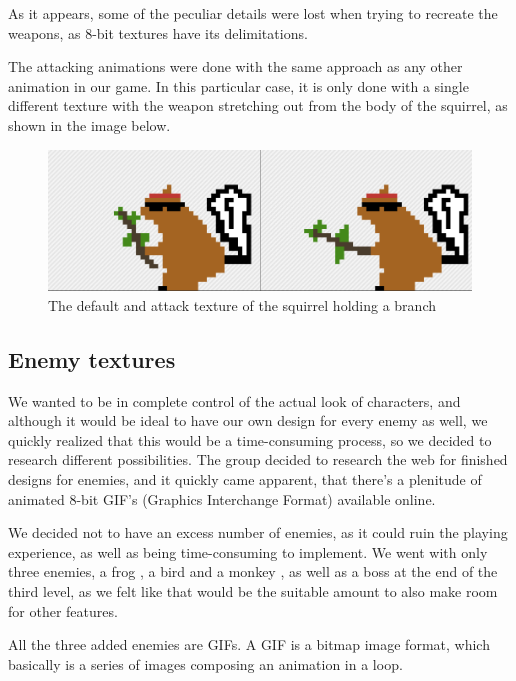 \documentclass[12p]{article}
\begin{document}
As it appears, some of the peculiar details were lost when trying to recreate the weapons, as 8-bit textures have its delimitations. 

The attacking animations were done with the same approach as any other animation in our game. In this particular case, it is only done with a single different texture with the weapon stretching out from the body of the squirrel, as shown in the image below.

\begin{figure}[ht]
 \center
 \includegraphics[width=1\textwidth]{Documentation/Picture2.png}
 \caption{The default and attack texture of the squirrel holding a branch}
 \label{fig:squirrel_branch_default_attack_texture}
\end{figure}

\newpage 
\subsection{Enemy textures}

We wanted to be in complete control of the actual look of characters, and although it would be ideal to have our own design for every enemy as well, we quickly realized that this would be a time-consuming process, so we decided to research different possibilities. The group decided to research the web for finished designs for enemies, and it quickly came apparent, that there’s a plenitude of animated 8-bit GIF’s (Graphics Interchange Format) available online. 

We decided not to have an excess number of enemies, as it could ruin the playing experience, as well as being time-consuming to implement. We went with only three enemies, a frog \cite{FrogEnemyDesign}, a bird \cite{BirdEnemyDesign} and a monkey \cite{MonkeyEnemyDesign}, as well as a boss \cite{BossEnemyDesign} at the end of the third level, as we felt like that would be the suitable amount to also make room for other features. 

All the three added enemies are GIFs. A GIF is a bitmap image format, which basically is a series of images composing an animation in a loop.
\end{document}
